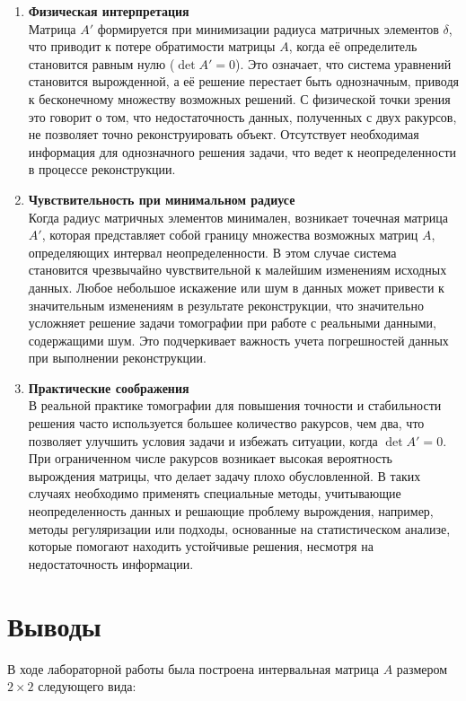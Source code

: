 \documentclass[a4paper,14pt]{article}
\begin{document}
	\begin{enumerate}
		\item \textbf{Физическая интерпретация} \\
			Матрица \( A' \) формируется при минимизации радиуса матричных элементов \( \delta \),
			 что приводит к потере обратимости матрицы \( A \), когда её определитель становится равным нулю
			  (\( \det A' = 0 \)). Это означает, что система уравнений становится вырожденной, а её решение 
			  перестает быть однозначным, приводя к бесконечному множеству возможных решений. 
			  С физической точки зрения это говорит о том, что недостаточность данных, полученных с двух ракурсов, 
			  не позволяет точно реконструировать объект. Отсутствует необходимая информация для однозначного решения 
			  задачи, что ведет к неопределенности в процессе реконструкции.
		
		\item \textbf{Чувствительность при минимальном радиусе} \\
			Когда радиус матричных элементов минимален, возникает точечная матрица \( A' \), которая представляет 
			собой границу множества возможных матриц \( A \), определяющих интервал неопределенности. В этом 
			случае система становится чрезвычайно чувствительной к малейшим изменениям исходных данных. Любое 
			небольшое искажение или шум в данных может привести к значительным изменениям в результате реконструкции, 
			что значительно усложняет решение задачи томографии при работе с реальными данными, содержащими шум. 
			Это подчеркивает важность учета погрешностей данных при выполнении реконструкции.
	
		\item \textbf{Практические соображения} \\
			В реальной практике томографии для повышения точности и стабильности решения часто используется 
			большее количество ракурсов, чем два, что позволяет улучшить условия задачи и избежать ситуации, 
			когда \( \det A' = 0 \). При ограниченном числе ракурсов возникает высокая вероятность вырождения матрицы, 
			что делает задачу плохо обусловленной. В таких случаях необходимо применять специальные методы, учитывающие 
			неопределенность данных и решающие проблему вырождения, например, методы регуляризации или подходы, 
			основанные на статистическом анализе, которые помогают находить устойчивые решения, несмотря на недостаточность информации.
	\end{enumerate}

	\section{Выводы}
	В ходе лабораторной работы была построена интервальная матрица \(A\)
	размером \(2 \times 2\) следующего вида:
\end{document}
